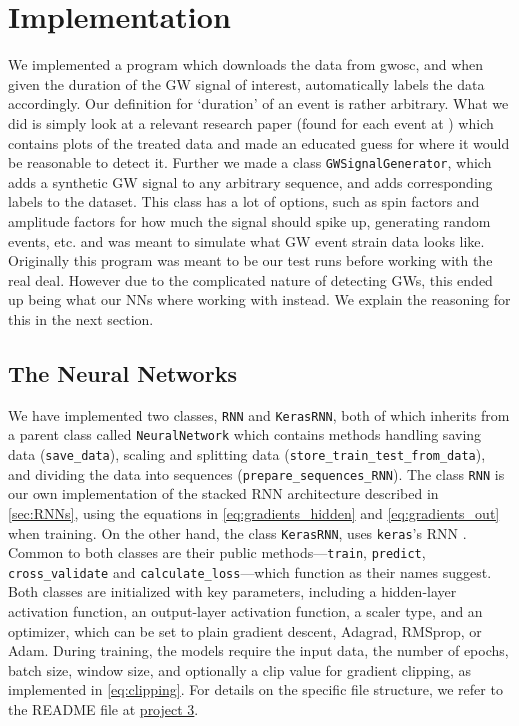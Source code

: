 \documentclass[%
reprint,
amsmath,amssymb,
aps,
]{revtex4-2}
\begin{document}
\section{Implementation}
We implemented a program which downloads the data from gwosc, and when given the duration of the GW signal of interest, automatically labels the data accordingly. Our definition for `duration' of an event is rather arbitrary. What we did is simply look at a relevant research paper (found for each event at \cite{gwosc_all_events}) which contains plots of the treated data and made an educated guess for where it would be reasonable to detect it. Further we made a class \texttt{GWSignalGenerator}, which adds a synthetic GW signal to any arbitrary sequence, and adds corresponding labels to the dataset. This class has a lot of options, such as spin factors and amplitude factors for how much the signal should spike up, generating random events, etc. and was meant to simulate what GW event strain data looks like. Originally this program was meant to be our test runs before working with the real deal. However due to the complicated nature of detecting GWs, this ended up being what our NNs where working with instead. We explain the reasoning for this in the next section.

\subsection{The Neural Networks}
We have implemented two classes, \texttt{RNN} and \texttt{KerasRNN}, both of which inherits from a parent class called \texttt{NeuralNetwork} which contains methods handling saving data (\texttt{save\_data}), 
scaling and splitting data (\texttt{store\_train\_test\_from\_data}), and dividing the data into sequences (\texttt{prepare\_sequences\_RNN}). The class \texttt{RNN} is our own implementation of the stacked RNN architecture described in \ref{sec:RNNs}, using the equations in \eqref{eq:gradients_hidden} and \eqref{eq:gradients_out} when training. On the other hand, the class \texttt{KerasRNN}, uses \texttt{keras}'s RNN \cite{keras_recurrent_layers}. Common to both classes are their public methods—\texttt{train}, \texttt{predict}, \texttt{cross\_validate} and \texttt{calculate\_loss}—which function as their names suggest. Both classes are initialized with key parameters, including a hidden-layer activation function, an output-layer activation function, a scaler type, and an optimizer, which can be set to plain gradient descent, Adagrad, RMSprop, or Adam. During training, the models require the input data, the number of epochs, batch size, window size, and optionally a clip value for gradient clipping, as implemented in \eqref{eq:clipping}. For details on the specific file structure, we refer to the README file at \href{https://github.com/EdvardRornes/FYS-STK4155/tree/main/Project3}{project 3}.
\end{document}
